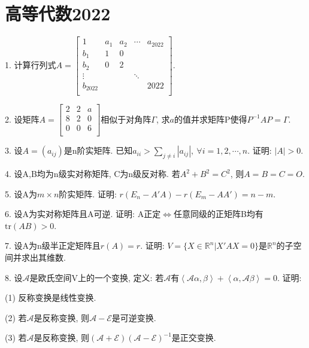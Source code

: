 \documentclass[12pt, a4paper, twoside]{ctexart}%
\begin{document}
	\section{高等代数2022}
	1. 计算行列式$A=\begin{bmatrix}
		1&a_1&a_2&\cdots&a_{2022}\\
		b_1&1&0& & \\
		b_2&0&2& & \\
		\vdots& & & \ddots& \\
		 b_{2022}& & & &2022\\
	\end{bmatrix}$.\par 
	2. 设矩阵$A=\begin{bmatrix}
		2&2&a\\
		8&2&0\\
		0&0&6\\
	\end{bmatrix}$相似于对角阵$\Gamma$, 求$a$的值并求矩阵P使得$P^{-1}AP=\Gamma$.\par 
	3. 设$A=(a_{ij})$是n阶实矩阵. 已知$a_{ii}>\sum\limits_{j\neq i}|a_{ij}|,\ \forall i=1,2,\cdots,n$. 证明: $|A|>0$.\par 
	4. 设A,B均为n级实对称矩阵, C为n级反对称. 若$A^2+B^2=C^2$, 则$A=B=C=O$.\par 
	5. 设A为$m\times n$阶实矩阵. 证明: $r(E_n-A'A)-r(E_m-AA')=n-m.$\par 
	6. 设A为实对称矩阵且A可逆. 证明: A正定$\iff$任意同级的正矩阵B均有$\mathrm{tr}(AB)>0$.\par 
	7. 设A为n级半正定矩阵且$r(A)=r$. 证明: $V=\{X\in\mathbb{R}^n\big|X'AX=0\}$是$\mathbb{R}^n$的子空间并求出其维数.\par
	8. 设$\mathscr{A}$是欧氏空间V上的一个变换, 定义: 若$\mathscr{A}$有$\left<\mathscr{A}\alpha,\beta\right>+\left<\alpha,\mathscr{A}\beta\right>=0$.
	证明: \par
	\hspace{1.2em}(1) 反称变换是线性变换.\par
	\hspace{1.2em}(2) 若$\mathscr{A}$是反称变换, 则$\mathscr{A-E}$是可逆变换.\par
	\hspace{1.2em}(3) 若$\mathscr{A}$是反称变换, 则$(\mathscr{A+E})(\mathscr{A-E})^{-1}$是正交变换. \par
	\clearpage
\end{document}
